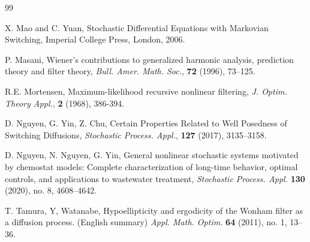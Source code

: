 \documentclass[12pt]{amsart}
\theoremstyle{remark}
\numberwithin{equation}{section}
\numberwithin{equation}{section}
\newcommand{\1}{\boldsymbol{1}}
\begin{document}
\begin{thebibliography}{99}
{ X. Mao and C. Yuan, Stochastic Differential Equations with Markovian Switching, Imperial
College Press, London, 2006.




 P. Masani, Wiener’s contributions to generalized harmonic analysis,
prediction theory and filter theory, {\it Bull. Amer. Math. Soc.}, {\bf 72} (1996),
73--125.




%

R.E. Mortensen,
Maximum-likelihood recursive nonlinear filtering,
{\it J. Optim. Theory Appl.}, {\bf 2} (1968), 386-394.


 D. Nguyen, G. Yin, Z. Chu, Certain Properties Related to Well Posedness of Switching Diffusions, {\it Stochastic Process. Appl.}, {\bf 127} (2017), 3135--3158.

 D. Nguyen, N. Nguyen, G. Yin, General nonlinear stochastic systems motivated by chemostat models: Complete characterization of long-time behavior, optimal controls, and applications to wastewater treatment,  {\it Stochastic Process. Appl.}  {\bf 130} (2020), no. 8, 4608--4642.



T. Tamura,
Y, Watanabe, Hypoellipticity and ergodicity of the Wonham filter as a diffusion process. (English summary)
{\it Appl. Math. Optim.} {\bf 64} (2011), no. 1, 13–36.

}
\end{thebibliography}
\end{document}
